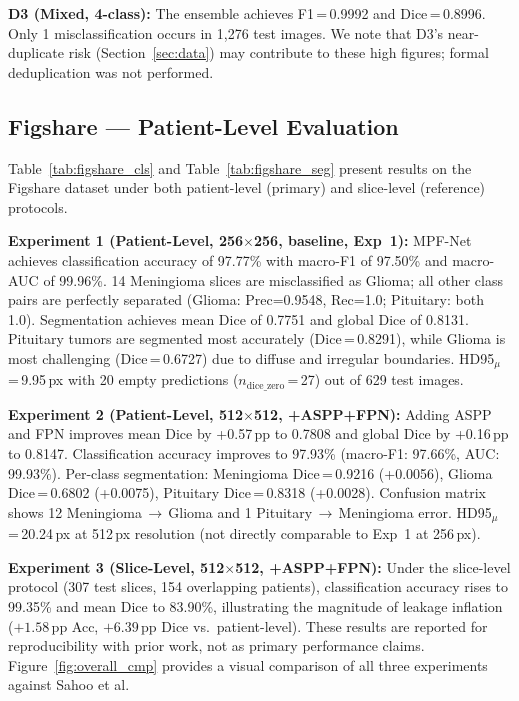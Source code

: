 \documentclass[journal]{IEEEtran}
\begin{document}
\textbf{D3 (Mixed, 4-class):} The ensemble achieves F1\,=\,0.9992 and
Dice\,=\,0.8996. Only 1 misclassification occurs in 1{,}276 test images. We
note that D3's near-duplicate risk (Section~\ref{sec:data}) may contribute to
these high figures; formal deduplication was not performed.

\subsection{Figshare — Patient-Level Evaluation}
Table~\ref{tab:figshare_cls} and Table~\ref{tab:figshare_seg} present results
on the Figshare dataset under both patient-level (primary) and slice-level
(reference) protocols.




\textbf{Experiment 1 (Patient-Level, 256$\times$256, baseline, Exp~1):}
MPF-Net achieves classification accuracy of 97.77\% with macro-F1 of 97.50\%
and macro-AUC of 99.96\%. 14 Meningioma slices are misclassified as Glioma;
all other class pairs are perfectly separated (Glioma: Prec=0.9548, Rec=1.0;
Pituitary: both 1.0). Segmentation achieves mean Dice of 0.7751 and global
Dice of 0.8131. Pituitary tumors are segmented most accurately
(Dice\,=\,0.8291), while Glioma is most challenging (Dice\,=\,0.6727) due
to diffuse and irregular boundaries. HD95$_\mu$\,=\,9.95\,px with 20 empty
predictions ($n_{\text{dice\_zero}}$\,=\,27) out of 629 test images.

\textbf{Experiment 2 (Patient-Level, 512$\times$512, +ASPP+FPN):}
Adding ASPP and FPN improves mean Dice by +0.57\,pp to 0.7808 and global
Dice by +0.16\,pp to 0.8147. Classification accuracy improves to 97.93\%
(macro-F1: 97.66\%, AUC: 99.93\%). Per-class segmentation: Meningioma
Dice\,=\,0.9216 (+0.0056), Glioma Dice\,=\,0.6802 (+0.0075), Pituitary
Dice\,=\,0.8318 (+0.0028). Confusion matrix shows 12 Meningioma\,$\to$\,Glioma
and 1 Pituitary\,$\to$\,Meningioma error. HD95$_\mu$\,=\,20.24\,px at
512\,px resolution (not directly comparable to Exp~1 at 256\,px).

\textbf{Experiment 3 (Slice-Level, 512$\times$512, +ASPP+FPN):}
Under the slice-level protocol (307 test slices, 154 overlapping patients),
classification accuracy rises to 99.35\% and mean Dice to 83.90\%,
illustrating the magnitude of leakage inflation
($+1.58\,\text{pp}$ Acc, $+6.39\,\text{pp}$ Dice vs.\ patient-level).
These results are reported for reproducibility with prior work, not as
primary performance claims. Figure~\ref{fig:overall_cmp} provides a visual
comparison of all three experiments against Sahoo et al.
\end{document}
